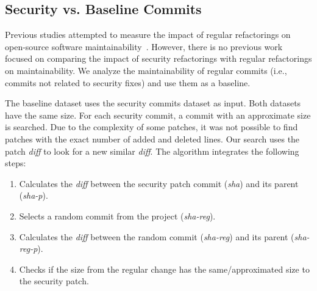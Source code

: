 \documentclass[10pt,conference]{IEEEtran}
\begin{document}
%
\subsection{Security vs. Baseline Commits}
%
Previous studies attempted to measure the impact of regular refactorings on
open-source software maintainability~\cite{HEGEDUS2018313}. However, there is no
previous work focused on comparing the impact of security refactorings with
regular refactorings on maintainability.
We analyze the maintainability of regular commits (i.e., commits not related
to security fixes) and use them as a baseline.

The baseline dataset uses the security commits dataset as input.
Both datasets have the same size. For each
security commit, a commit with an approximate size is searched. Due to the complexity 
of some patches, it was not possible to find patches with the exact number of added and 
deleted lines. Our search uses the patch \emph{diff} to look for a new similar \emph{diff}. The algorithm integrates the following steps:

\begin{enumerate}
\item Calculates the \emph{diff} between the security patch commit (\emph{sha}) and its parent (\emph{sha-p}).
\item Selects a random commit from the project (\emph{sha-reg}).
\item Calculates the \emph{diff} between the random commit (\emph{sha-reg}) and its parent (\emph{sha-reg-p}).
\item Checks if the size from the regular change has the same/approximated size to 
the security patch.
\end{enumerate}
\end{document}
